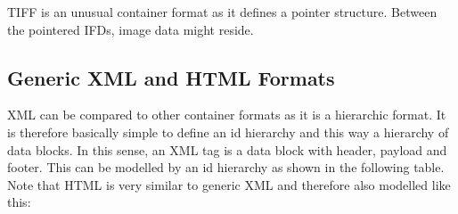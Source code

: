 
TIFF is an unusual container format as it defines a pointer structure. Between the pointered IFDs, image data might reside.




\subsection{Generic XML and HTML Formats}
\label{sec:GenericXMLFormat}

XML can be compared to other container formats as it is a hierarchic format. It is therefore basically simple to define an id hierarchy and this way a hierarchy of data blocks. In this sense, an XML tag is a data block with header, payload and footer. This can be modelled by an id hierarchy as shown in the following table. Note that HTML is very similar to generic XML and therefore also modelled like this:

